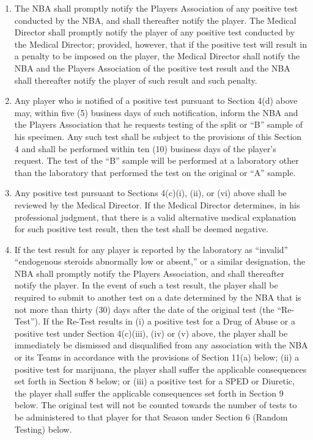 \documentclass[
]{book}
\begin{document}
\begin{enumerate}
\item
  The NBA shall promptly notify the Players Association of any positive test conducted by the NBA, and shall thereafter notify the player. The Medical Director shall promptly notify the player of any positive test conducted by the Medical Director; provided, however, that if the positive test will result in a penalty to be imposed on the player, the Medical Director shall notify the NBA and the Players Association of the positive test result and the NBA shall thereafter notify the player of such result and such penalty.
\item
  Any player who is notified of a positive test pursuant to Section 4(d) above may, within five (5) business days of such notification, inform the NBA and the Players Association that he requests testing of the split or ``B'' sample of his specimen. Any such test shall be subject to the provisions of this Section 4 and shall be performed within ten (10) business days of the player's request. The test of the ``B'' sample will be performed at a laboratory other than the laboratory that performed the test on the original or ``A'' sample.
\item
  Any positive test pursuant to Sections 4(c)(i), (ii), or (vi) above shall be reviewed by the Medical Director. If the Medical Director determines, in his professional judgment, that there is a valid alternative medical explanation for such positive test result, then the test shall be deemed negative.
\item
  If the test result for any player is reported by the laboratory as ``invalid'' ``endogenous steroids abnormally low or absent,'' or a similar designation, the NBA shall promptly notify the Players Association, and shall thereafter notify the player. In the event of such a test result, the player shall be required to submit to another test on a date determined by the NBA that is not more than thirty (30) days after the date of the original test (the ``Re-Test''). If the Re-Test results in (i) a positive test for a Drug of Abuse or a positive test under Section 4(c)(iii), (iv) or (v) above, the player shall be immediately be dismissed and disqualified from any association with the NBA or its Teams in accordance with the provisions of Section 11(a) below; (ii) a positive test for marijuana, the player shall suffer the applicable consequences set forth in Section 8 below; or (iii) a positive test for a SPED or Diuretic, the player shall suffer the applicable consequences set forth in Section 9 below. The original test will not be counted towards the number of tests to be administered to that player for that Season under Section 6 (Random Testing) below.
\end{enumerate}
\end{document}
